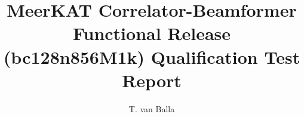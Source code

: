 \documentclass[11pt,english,twoside]{article}
\author{T. van Balla}
\begin{document}
\title{MeerKAT Correlator-Beamformer Functional Release  (bc128n856M1k) Qualification Test Report}
\makekatdocbeginning
\end{document}
